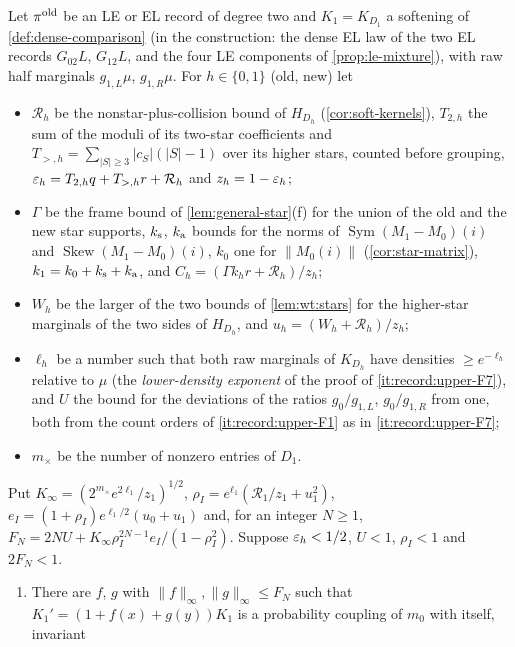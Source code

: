\begin{proposition}\label{prop:dense-comparison}
Let $\pi^{\rm old}$ be an LE or EL record of degree two and $K_1=K_{D_1}$ a
softening of \cref{def:dense-comparison} (in the construction: the dense EL law of
the two EL records $G_{02}L$, $G_{12}L$, and the four LE components of
\cref{prop:le-mixture}), with raw half marginals $g_{1,L}\mu$, $g_{1,R}\mu$. For
$h\in\{0,1\}$ (old, new) let
\begin{itemize}
\item $\mathcal R_h$ be the nonstar-plus-collision bound of $H_{D_h}$
 (\cref{cor:soft-kernels}), $T_{2,h}$ the sum of the moduli of its two-star
 coefficients and $T_{>,h}=\sum_{|S|\ge3}|c_S|(|S|-1)$ over its higher stars,
 counted before grouping, $\varepsilon_h=T_{2,h}q+T_{>,h}r+\mathcal R_h$ and
 $z_h=1-\varepsilon_h$;
\item $\Gamma$ be the frame bound of \cref{lem:general-star}(f) for the union of
 the old and the new star supports, $k_{\rm s}$, $k_{\rm a}$ bounds for the norms of
 $\operatorname{Sym}(M_1-M_0)(i)$ and $\operatorname{Skew}(M_1-M_0)(i)$, $k_0$ one
 for $\|M_0(i)\|$ (\cref{cor:star-matrix}), $k_1=k_0+k_{\rm s}+k_{\rm a}$, and
 $C_h=(\Gamma k_hr+\mathcal R_h)/z_h$;
\item $W_h$ be the larger of the two bounds of \cref{lem:wt:stars} for the
 higher-star marginals of the two sides of $H_{D_h}$, and $u_h=(W_h+\mathcal R_h)/z_h$;
\item $\ell_h$ be a number such that both raw marginals of $K_{D_h}$ have densities $\ge e^{-\ell_h}$ relative to $\mu$ (the \emph{lower-density exponent} of the proof of \ref{it:record:upper-F7}), and $U$ the bound for the deviations of the ratios
 $g_0/g_{1,L}$, $g_0/g_{1,R}$ from one, both from the count orders of
 \ref{it:record:upper-F1} as in \ref{it:record:upper-F7};
\item $m_\times$ be the number of nonzero entries of $D_1$.
\end{itemize}
Put $K_\infty=(2^{m_\times}e^{2\ell_1}/z_1)^{1/2}$,
$\rho_I=e^{\ell_1}(\mathcal R_1/z_1+u_1^2)$, $e_I=(1+\rho_I)e^{\ell_1/2}(u_0+u_1)$
and, for an integer $N\ge1$,
$F_N=2NU+K_\infty\rho_I^{2N-1}e_I/(1-\rho_I^2)$. Suppose $\varepsilon_h<1/2$, $U<1$,
$\rho_I<1$ and $2F_N<1$.
\begin{enumerate}[label=(\alph*)]
\item There are $f$, $g$ with $\|f\|_\infty,\|g\|_\infty\le F_N$ such that
 $K_1'=(1+f(x)+g(y))K_1$ is a probability coupling of $m_0$ with itself, invariant

\end{enumerate}
\end{proposition}
